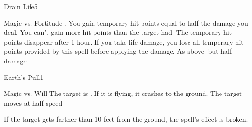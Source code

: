 \begin{spellsection}{Drain Life}{5}
\begin{spellheader}
\end{spellheader}
\begin{spellcontent}
    \begin{spelltargetinginfo}
    \end{spelltargetinginfo}
    \begin{spelleffects}
        \begin{spellattack}{Magic vs. Fortitude}
            \spellsuccess {}. You gain temporary hit points equal to half the damage you deal. You can't gain more hit points than the target had. The temporary hit points disappear after 1 hour. If you take life damage, you lose all temporary hit points provided by this spell before applying the damage.
            \spellfailure As above, but half damage.
        \end{spellattack}
        \spelldur \durlong
    \end{spelleffects}
\end{spellcontent}
\begin{spellfooter}
\end{spellfooter}

\begin{comment}
\subsubsection{E}
\end{comment}
\end{spellsection}

\begin{spellsection}{Earth's Pull}{1}
\begin{spellheader}
\end{spellheader}
\begin{spellcontent}
    \begin{spelltargetinginfo}
        \spellrng{\rngmed}
    \end{spelltargetinginfo}
    \begin{spelleffects}
        \begin{spellattack}{Magic vs. Will}
            \spellsuccess The target is \immobilized. If it is flying, it crashes to the ground.
            \spellfailure The target moves at half speed.
        \end{spellattack}
        \spelldur \durshort
    \end{spelleffects}
\end{spellcontent}
\begin{spellfooter}
    \spellnotes If the target gets farther than 10 feet from the ground, the spell's effect is broken.
\end{spellfooter}
\end{spellsection}

